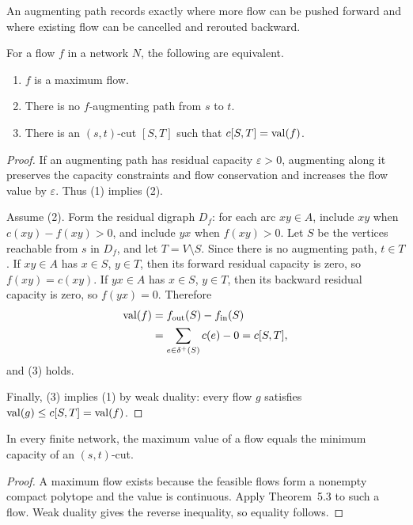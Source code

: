 \begin{noteremark}
An augmenting path records exactly where more flow can be pushed forward and
where existing flow can be cancelled and rerouted backward.
\end{noteremark}

\begin{notetheorem}
For a flow $f$ in a network $N$, the following are equivalent.
\begin{enumerate}
  \item $f$ is a maximum flow.
  \item There is no $f$-augmenting path from $s$ to $t$.
  \item There is an $(s,t)$-cut $[S,T]$ such that
        $c[S,T]=\operatorname{val}(f)$.
\end{enumerate}
\end{notetheorem}
\begin{proof}
If an augmenting path has residual capacity $\varepsilon>0$, augmenting along
it preserves the capacity constraints and flow conservation and increases the
flow value by $\varepsilon$.  Thus (1) implies (2).

Assume (2).  Form the residual digraph $D_f$: for each arc $xy\in A$, include
$xy$ when $c(xy)-f(xy)>0$, and include $yx$ when $f(xy)>0$.  Let $S$ be the
vertices reachable from $s$ in $D_f$, and let $T=V\setminus S$.  Since there
is no augmenting path, $t\in T$.  If $xy\in A$ has $x\in S$, $y\in T$, then
its forward residual capacity is zero, so $f(xy)=c(xy)$.  If $yx\in A$ has
$x\in S$, $y\in T$, then its backward residual capacity is zero, so
$f(yx)=0$.  Therefore
\[
\begin{aligned}
  \operatorname{val}(f)
  &=f_{\operatorname{out}}(S)-f_{\operatorname{in}}(S)\\
  &=\sum_{e\in\delta^+(S)}c(e)-0
   =c[S,T],
\end{aligned}
\]
and (3) holds.

Finally, (3) implies (1) by weak duality: every flow $g$ satisfies
$\operatorname{val}(g)\le c[S,T]=\operatorname{val}(f)$.
\end{proof}
\begin{notetheorem}
In every finite network, the maximum value of a flow equals the minimum
capacity of an $(s,t)$-cut.
\end{notetheorem}
\begin{proof}
A maximum flow exists because the feasible flows form a nonempty compact
polytope and the value is continuous.  Apply Theorem~5.3 to such a flow.
Weak duality gives the reverse inequality, so equality follows.
\end{proof}


